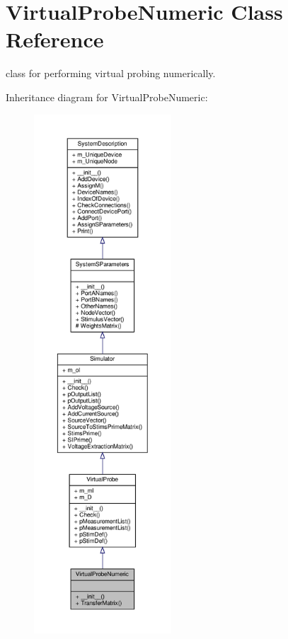 \hypertarget{classSignalIntegrity_1_1SystemDescriptions_1_1VirtualProbeNumeric_1_1VirtualProbeNumeric}{}\section{Virtual\+Probe\+Numeric Class Reference}
\label{classSignalIntegrity_1_1SystemDescriptions_1_1VirtualProbeNumeric_1_1VirtualProbeNumeric}


class for performing virtual probing numerically.  




Inheritance diagram for Virtual\+Probe\+Numeric\+:
\nopagebreak
\begin{figure}[H]
\begin{center}
\leavevmode
\includegraphics[height=550pt]{classSignalIntegrity_1_1SystemDescriptions_1_1VirtualProbeNumeric_1_1VirtualProbeNumeric__inherit__graph}
\end{center}
\end{figure}


